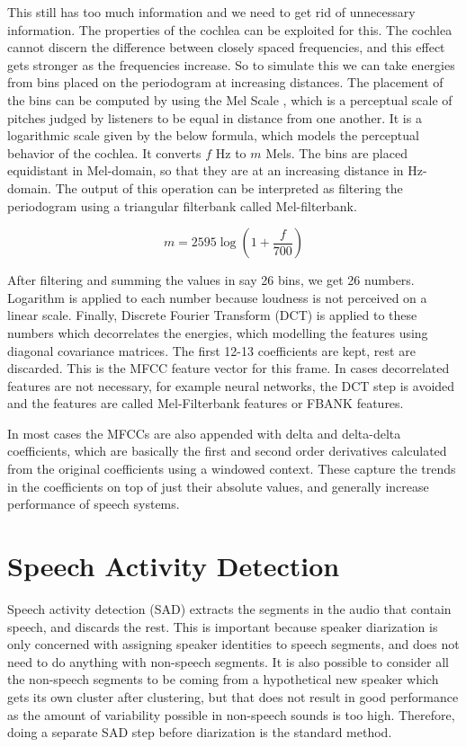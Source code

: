 This still has too much information and we need to get rid of unnecessary information. The properties of the cochlea can be exploited for this. The cochlea cannot discern the difference between closely spaced frequencies, and this effect gets stronger as the frequencies increase. So to simulate this we can take energies from bins placed on the periodogram at increasing distances. The placement of the bins can be computed by using the Mel Scale \cite{logan2000mel}, which is a perceptual scale of pitches judged by listeners to be equal in distance from one another. It is a logarithmic scale given by the below formula, which models the perceptual behavior of the cochlea. It converts $f$ Hz to $m$ Mels. The bins are placed equidistant in Mel-domain, so that they are at an increasing distance in Hz-domain. The output of this operation can be interpreted as filtering the periodogram using a triangular filterbank called Mel-filterbank.

$$ m = 2595 \log \left( 1+\frac{f}{700} \right) $$

After filtering and summing the values in say 26 bins, we get 26 numbers. Logarithm is applied to each number because loudness is not perceived on a linear scale. Finally, Discrete Fourier Transform (DCT) is applied to these numbers which decorrelates the energies, which modelling the features using diagonal covariance matrices. The first 12-13 coefficients are kept, rest are discarded. This is the MFCC feature vector for this frame. In cases decorrelated features are not necessary, for example neural networks, the DCT step is avoided and the features are called Mel-Filterbank features or FBANK features.

In most cases the MFCCs are also appended with delta and delta-delta coefficients, which are basically the first and second order derivatives calculated from the original coefficients using a windowed context. These capture the trends in the coefficients on top of just their absolute values, and generally increase performance of speech systems.

\section{Speech Activity Detection}
Speech activity detection (SAD) extracts the segments in the audio that contain speech, and discards the rest. This is important because speaker diarization is only concerned with assigning speaker identities to speech segments, and does not need to do anything with non-speech segments. It is also possible to consider all the non-speech segments to be coming from a hypothetical new speaker which gets its own cluster after clustering, but that does not result in good performance as the amount of variability possible in non-speech sounds is too high. Therefore, doing a separate SAD step before diarization is the standard method.


